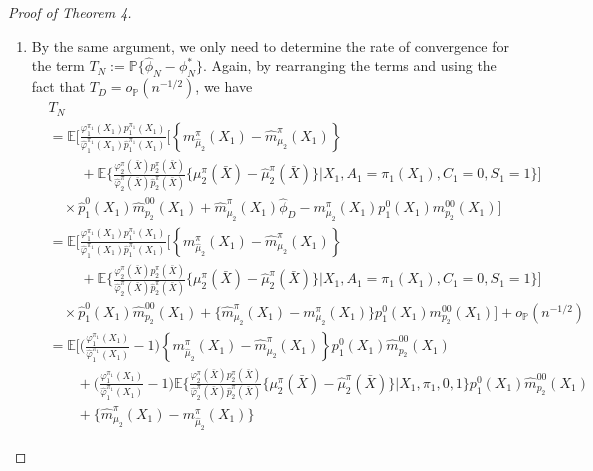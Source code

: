 \documentclass{article}
\newcommand{\wh}{\widehat}
\newcommand{\pk}{{\varphi}}
\newcommand{\pr}{\mathbb{P}}
\begin{document}
\begin{proof}[Proof of Theorem 4]
\begin{enumerate}
	
	\item By the same argument, we only need to determine the rate of convergence for the term $T_N := \mathbb P\{ \hat\phi_N - \phi_N^* \}$. Again, by rearranging the terms and using the fact that $T_D = o_{\pr}(n^{-1/2})$, we have
	\begin{align*}
		&T_N \\
		&= \mathbb E\Bigg[ \frac{\pk_1^{\pi_1}(X_1)p_1^{\pi_1}(X_1)}{\wh\pk_1^{\pi_1}(X_1)\wh p_1^{\pi_1}(X_1)} 
		  \bigg[ \left\{ m_{\hat\mu_2}^{\pi}(X_1) - \wh m_{\mu_2}^{\pi}(X_1) \right\}    \\
		  &\qquad\;+ 
		    \mathbb E\bigg\{ 
		    \frac{\pk_2^{\pi}(\bar X)p_2^{\pi}(\bar X)}{\wh\pk_2^{\pi}(\bar X)\wh p_2^{\pi}(\bar X)}
		    \big\{\mu_2^{\pi}(\bar X) - \hat\mu_2^{\pi}(\bar X)\big\} 
		  \Big\vert X_1,A_1=\pi_1(X_1),C_1=0,S_1=1\bigg\}  \bigg]\\
		  &\quad \times \wh p_1^{0}(X_1) \wh m_{p_2}^{00}(X_1) + \wh m_{\mu_2}^{\pi}(X_1) \wh\phi_D - m_{\mu_2}^{\pi}(X_1) p_1^{0}(X_1) m_{p_2}^{00}(X_1)
		  \Bigg] \\
		&= \mathbb E\Bigg[ \frac{\pk_1^{\pi_1}(X_1)p_1^{\pi_1}(X_1)}{\wh\pk_1^{\pi_1}(X_1)\wh p_1^{\pi_1}(X_1)} 
		  \bigg[ \left\{ m_{\hat\mu_2}^{\pi}(X_1) - \wh m_{\mu_2}^{\pi}(X_1) \right\}    \\
		  &\qquad\;+
		   \mathbb E\bigg\{ 
		    \frac{\pk_2^{\pi}(\bar X)p_2^{\pi}(\bar X)}{\wh\pk_2^{\pi}(\bar X)\wh p_2^{\pi}(\bar X)}
		    \big\{\mu_2^{\pi}(\bar X) - \hat\mu_2^{\pi}(\bar X)\big\} 
		    \Big\vert X_1,A_1=\pi_1(X_1),C_1=0,S_1=1\bigg\}  \bigg]\\
		  &\quad \times \wh p_1^{0}(X_1) \wh m_{p_2}^{00}(X_1) 
		   +\{\wh m_{\mu_2}^{\pi}(X_1) - m_{\mu_2}^{\pi}(X_1)\} p_1^{0}(X_1) m_{p_2}^{00}(X_1)
		  \Bigg] + o_{\pr}(n^{-1/2}) \\
		&= \mathbb E\Bigg[ \bigg( \frac{\pk_1^{\pi_1}(X_1)}{\wh\pk_1^{\pi_1}(X_1)} - 1 \bigg)
		  \left\{ m_{\hat\mu_2}^{\pi}(X_1) - \wh m_{\mu_2}^{\pi}(X_1) \right\} p_1^{0}(X_1) \wh m_{p_2}^{00}(X_1)   \\
		  &\qquad+
		   \bigg(\frac{\pk_1^{\pi_1}(X_1)}{\wh\pk_1^{\pi_1}(X_1)}-1\bigg)
		   \mathbb E\bigg\{ 
		    \frac{\pk_2^{\pi}(\bar X)p_2^{\pi}(\bar X)}{\wh\pk_2^{\pi}(\bar X)\wh p_2^{\pi}(\bar X)}
		    \big\{\mu_2^{\pi}(\bar X) - \hat\mu_2^{\pi}(\bar X)\big\} 
		    \Big\vert X_1,\pi_1,0,1\bigg\} p_1^{0}(X_1) \wh m_{p_2}^{00}(X_1)  \\
		  &\qquad+
		   \big\{\wh m_{\mu_2}^{\pi}(X_1) - m_{\hat\mu_2}^{\pi}(X_1)\big\}

\end{align*}
\end{enumerate}
\end{proof}
\end{document}
